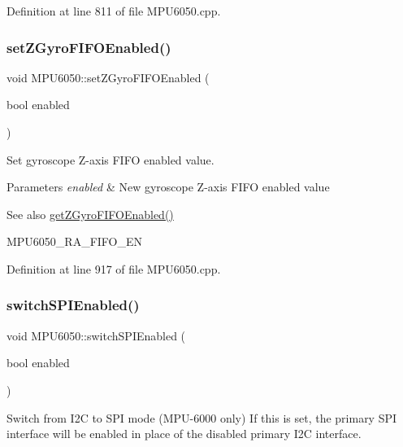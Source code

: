 Definition at line 811 of file M\+P\+U6050.\+cpp.

\mbox{\label{classMPU6050_af5b5bc39b66466ba910f6eef1259444c}} 
\subsubsection{\texorpdfstring{setZGyroFIFOEnabled()}{setZGyroFIFOEnabled()}}
{\footnotesize\ttfamily void M\+P\+U6050\+::set\+Z\+Gyro\+F\+I\+F\+O\+Enabled (\begin{DoxyParamCaption}\item[{bool}]{enabled }\end{DoxyParamCaption})}



Set gyroscope Z-\/axis F\+I\+FO enabled value. 


\begin{DoxyParams}{Parameters}
{\em enabled} & New gyroscope Z-\/axis F\+I\+FO enabled value \\
\hline
\end{DoxyParams}
\begin{DoxySeeAlso}{See also}
\mbox{\hyperlink{classMPU6050_adbbbd131c74f37dd545403633eb317ff}{get\+Z\+Gyro\+F\+I\+F\+O\+Enabled()}} 

M\+P\+U6050\+\_\+\+R\+A\+\_\+\+F\+I\+F\+O\+\_\+\+EN 
\end{DoxySeeAlso}


Definition at line 917 of file M\+P\+U6050.\+cpp.

\mbox{\label{classMPU6050_a269710b7bca814bbf67e7bb38c381650}} 
\subsubsection{\texorpdfstring{switchSPIEnabled()}{switchSPIEnabled()}}
{\footnotesize\ttfamily void M\+P\+U6050\+::switch\+S\+P\+I\+Enabled (\begin{DoxyParamCaption}\item[{bool}]{enabled }\end{DoxyParamCaption})}



Switch from I2C to S\+PI mode (M\+P\+U-\/6000 only) If this is set, the primary S\+PI interface will be enabled in place of the disabled primary I2C interface. 




